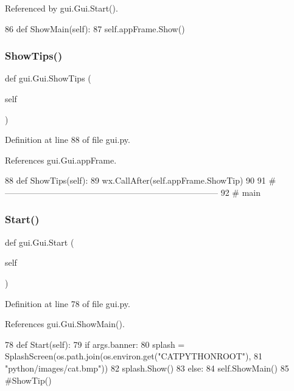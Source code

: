 Referenced by gui.\+Gui.\+Start().


\begin{DoxyCode}
86     \textcolor{keyword}{def }ShowMain(self):
87         self.appFrame.Show()
\end{DoxyCode}
\mbox{\label{classgui_1_1Gui_ad535e23af581441535c3d9e9e13422c8}} 
\subsubsection{\texorpdfstring{Show\+Tips()}{ShowTips()}}
{\footnotesize\ttfamily def gui.\+Gui.\+Show\+Tips (\begin{DoxyParamCaption}\item[{}]{self }\end{DoxyParamCaption})}



Definition at line 88 of file gui.\+py.



References gui.\+Gui.\+app\+Frame.


\begin{DoxyCode}
88     \textcolor{keyword}{def }ShowTips(self):
89         wx.CallAfter(self.appFrame.ShowTip)
90 
91 \textcolor{comment}{#---------------------------------------------------------------------------}
92 \textcolor{comment}{# main}
\end{DoxyCode}
\mbox{\label{classgui_1_1Gui_acfdb1311df034a58ca8dc817b6002ca2}} 
\subsubsection{\texorpdfstring{Start()}{Start()}}
{\footnotesize\ttfamily def gui.\+Gui.\+Start (\begin{DoxyParamCaption}\item[{}]{self }\end{DoxyParamCaption})}



Definition at line 78 of file gui.\+py.



References gui.\+Gui.\+Show\+Main().


\begin{DoxyCode}
78     \textcolor{keyword}{def }Start(self):
79         \textcolor{keywordflow}{if} args.banner:
80             splash = SplashScreen(os.path.join(os.environ.get(\textcolor{stringliteral}{"CATPYTHONROOT"}),
81                                                \textcolor{stringliteral}{"python/images/cat.bmp"}))
82             splash.Show()
83         \textcolor{keywordflow}{else}:
84             self.ShowMain()
85             \textcolor{comment}{#ShowTip()}
\end{DoxyCode}


